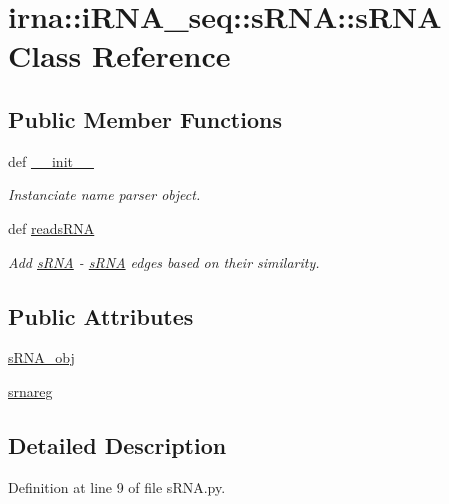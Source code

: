 \hypertarget{classirna_1_1iRNA__seq_1_1sRNA_1_1sRNA}{
\section{irna\-:\-:i\-R\-N\-A\-\_\-seq\-:\-:s\-R\-N\-A\-:\-:s\-R\-N\-A \-Class \-Reference}
\label{classirna_1_1iRNA__seq_1_1sRNA_1_1sRNA}
}
\subsection*{\-Public \-Member \-Functions}
\begin{DoxyCompactItemize}
\item 
def \hyperlink{classirna_1_1iRNA__seq_1_1sRNA_1_1sRNA_a0d8dc6ef4ec37c2cb0de452989ae3d18}{\-\_\-\-\_\-init\-\_\-\-\_\-}
\begin{DoxyCompactList}\small\item\em \-Instanciate name parser object. \end{DoxyCompactList}\item 
def \hyperlink{classirna_1_1iRNA__seq_1_1sRNA_1_1sRNA_a3bcd307eee476c8479d20f7075ccd4c3}{reads\-R\-N\-A}
\begin{DoxyCompactList}\small\item\em \-Add \hyperlink{classirna_1_1iRNA__seq_1_1sRNA_1_1sRNA}{s\-R\-N\-A} -\/ \hyperlink{classirna_1_1iRNA__seq_1_1sRNA_1_1sRNA}{s\-R\-N\-A} edges based on their similarity. \end{DoxyCompactList}\end{DoxyCompactItemize}
\subsection*{\-Public \-Attributes}
\begin{DoxyCompactItemize}
\item 
\hyperlink{classirna_1_1iRNA__seq_1_1sRNA_1_1sRNA_ac9066c984847991718ee10286b952d3c}{s\-R\-N\-A\-\_\-obj}
\item 
\hyperlink{classirna_1_1iRNA__seq_1_1sRNA_1_1sRNA_a601e0a2600204bf6fe9526cc626c43c7}{srnareg}
\end{DoxyCompactItemize}


\subsection{\-Detailed \-Description}


\-Definition at line 9 of file s\-R\-N\-A.\-py.




